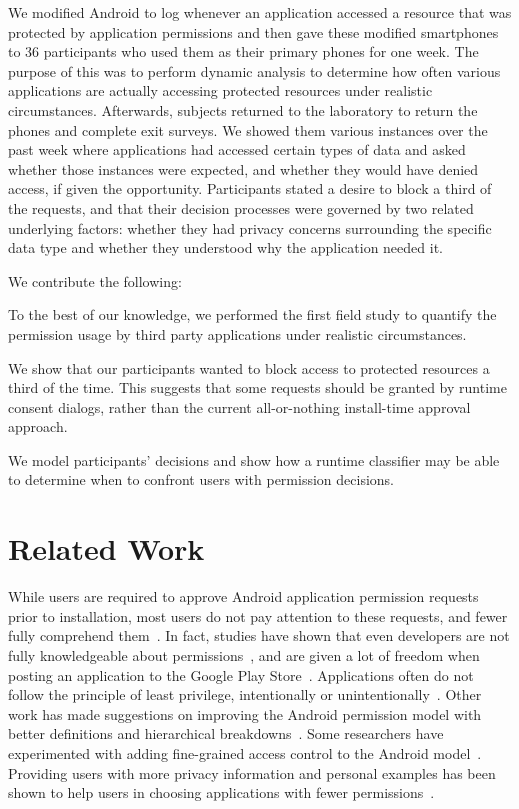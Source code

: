 \documentclass[letterpaper,twocolumn,10pt]{article}
\newenvironment{packed_item}{
\begin{itemize}
  \setlength{\itemsep}{1pt}
  \setlength{\parskip}{0pt}
  \setlength{\parsep}{0pt}
}{\end{itemize}}
\begin{document}
We modified Android to log whenever an application accessed a resource that was protected by application permissions and then gave these modified smartphones to 36 participants who used them as their primary phones for one week. The purpose of this was to perform dynamic analysis to determine how often various applications are actually accessing protected resources under realistic circumstances. Afterwards, subjects returned to the laboratory to return the phones and complete exit surveys. We showed them various instances over the past week where applications had accessed certain types of data and asked whether those instances were expected, and whether they would have denied access, if given the opportunity. Participants stated a desire to block a third of the requests, and that their decision processes were governed by two related underlying factors: whether they had privacy concerns surrounding the specific data type and whether they understood why the application needed it.

We contribute the following:
\begin{packed_item}
\item To the best of our knowledge, we performed the first field study to quantify the permission usage by third party applications under realistic circumstances.
\item We show that our participants wanted to block access to protected resources a third of the time. This suggests that some requests should be granted by runtime consent dialogs, rather than the current all-or-nothing install-time approval approach.
\item We model participants' decisions and show how a runtime classifier may be able to determine when to confront users with permission decisions.
\end{packed_item}

\section{Related Work}

While users are required to approve Android application permission requests prior to installation, most users do not pay attention to these requests, and fewer fully comprehend them~\cite{Felt2012,Kelley2012}. In fact, studies have shown that even developers are not fully knowledgeable about permissions~\cite{Stevens2013}, and are given a lot of freedom when posting an application to the Google Play Store~\cite{Barrera2012}. Applications often do not follow the principle of least privilege, intentionally or unintentionally~\cite{Wei2012}. Other work has made suggestions on improving the Android permission model with better definitions and hierarchical breakdowns~\cite{Barrera2010}. Some researchers have experimented with adding fine-grained access control to the Android model~\cite{Bugiel2013}. Providing users with more privacy information and personal examples has been shown to help users in choosing applications with fewer permissions~\cite{Kelley2013, Harbach2014}. 
\end{document}
